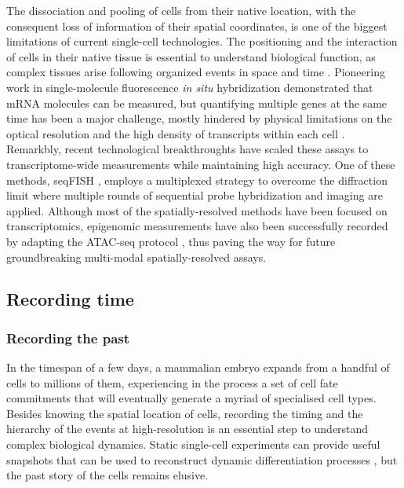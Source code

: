 The dissociation and pooling of cells from their native location, with the consequent loss of information of their spatial coordinates, is one of the biggest limitations of current single-cell technologies. The positioning and the interaction of cells in their native tissue is essential to understand biological function, as complex tissues arise following organized events in space and time \cite{Mayr2019}. Pioneering work in single-molecule fluorescence \textit{in situ} hybridization demonstrated that mRNA molecules can be measured, but quantifying multiple genes at the same time has been a major challenge, mostly hindered by physical limitations on the optical resolution and the high density of transcripts within each cell \cite{Eng2019}. Remarkbly, recent technological breakthroughts have scaled these assays to transcriptome-wide measurements while maintaining high accuracy. One of these methods, seqFISH \cite{Lubeck2014,Eng2019}, employs a multiplexed strategy to overcome the diffraction limit where multiple rounds of sequential probe hybridization and imaging are applied. Although most of the spatially-resolved methods have been focused on transcriptomics, epigenomic measurements have also been successfully recorded by adapting the ATAC-seq protocol \cite{Thornton2019}, thus paving the way for future groundbreaking multi-modal spatially-resolved assays.

\subsection{Recording time} 

\subsubsection{Recording the past} 

In the timespan of a few days, a mammalian embryo expands from a handful of cells to millions of them, experiencing in the process a set of cell fate commitments that will eventually generate a myriad of specialised cell types. Besides knowing the spatial location of cells, recording the timing and the hierarchy of the events at high-resolution is an essential step to understand complex biological dynamics. Static single-cell experiments can provide useful snapshots that can be used to reconstruct dynamic differentiation processes \cite{Weinreb2018}, but the past story of the cells remains elusive.

